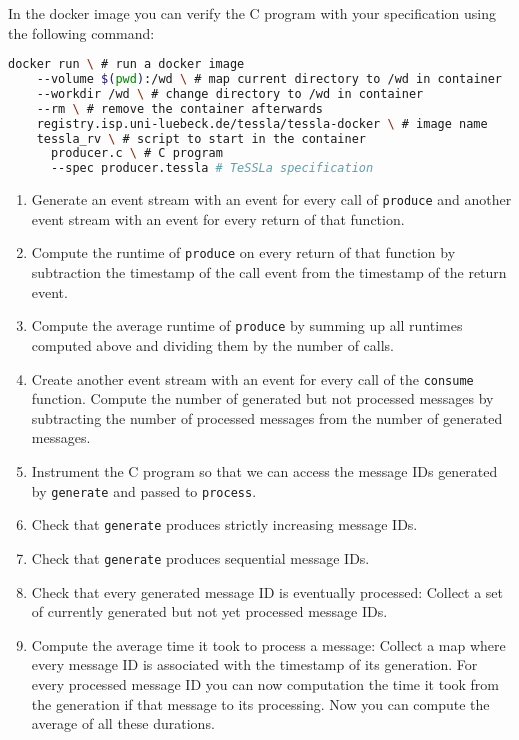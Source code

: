 \documentclass[language=en,sheet=7,prefix]{exercise}
\begin{document}
In the docker image you can verify the C program with your specification using the following command:

\begin{lstlisting}[gobble=2,language=bash]
  docker run \ # run a docker image
    --volume $(pwd):/wd \ # map current directory to /wd in container
    --workdir /wd \ # change directory to /wd in container
    --rm \ # remove the container afterwards
    registry.isp.uni-luebeck.de/tessla/tessla-docker \ # image name
    tessla_rv \ # script to start in the container
      producer.c \ # C program
      --spec producer.tessla # TeSSLa specification 
\end{lstlisting}

\begin{enumerate}
  \item Generate an event stream with an event for every call of \texttt{produce} and another event stream with an event for every return of that function.
  \item Compute the runtime of \texttt{produce} on every return of that function by subtraction the timestamp of the call event from the timestamp of the return event.
  \item Compute the average runtime of \texttt{produce} by summing up all runtimes computed above and dividing them by the number of calls.
  \item Create another event stream with an event for every call of the \texttt{consume} function. Compute the number of generated but not processed messages by subtracting the number of processed messages from the number of generated messages.
  \item Instrument the C program so that we can access the message IDs generated by \texttt{generate} and passed to \texttt{process}.
  \item Check that \texttt{generate} produces strictly increasing message IDs.
  \item Check that \texttt{generate} produces sequential message IDs.
  \item Check that every generated message ID is eventually processed: Collect a set of currently generated but not yet processed message IDs.
  \item Compute the average time it took to process a message: Collect a map where every message ID is associated with the timestamp of its generation. For every processed message ID you can now computation the time it took from the generation if that message to its processing. Now you can compute the average of all these durations.
\end{enumerate}
\end{document}
